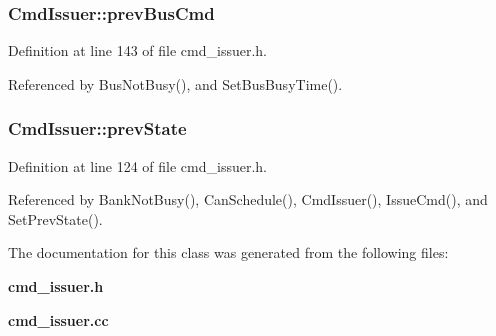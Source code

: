 \subsubsection[{prevBusCmd}]{ {\bf CmdIssuer::prevBusCmd}}\label{classCmdIssuer_83305626c36c8db41d32b0c30dce8fff}




Definition at line 143 of file cmd\_\-issuer.h.

Referenced by BusNotBusy(), and SetBusBusyTime().
\subsubsection[{prevState}]{ {\bf CmdIssuer::prevState}}\label{classCmdIssuer_cde77c9f037d0c964a05355d3afeeb1a}




Definition at line 124 of file cmd\_\-issuer.h.

Referenced by BankNotBusy(), CanSchedule(), CmdIssuer(), IssueCmd(), and SetPrevState().

The documentation for this class was generated from the following files:\begin{CompactItemize}
\item 
{\bf cmd\_\-issuer.h}\item 
{\bf cmd\_\-issuer.cc}\end{CompactItemize}
